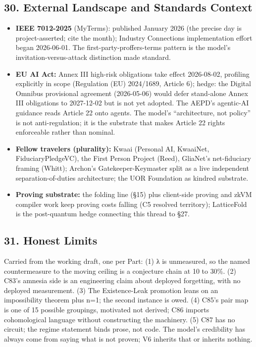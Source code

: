 \documentclass[
  11pt,
]{article}
\providecommand{\tightlist}{%
  \setlength{\itemsep}{0pt}\setlength{\parskip}{0pt}}
\begin{document}
\subsection{30. External Landscape and Standards
Context}\label{external-landscape-and-standards-context}

\begin{itemize}
\tightlist
\item
  \textbf{IEEE 7012-2025} (MyTerms): published January 2026 (the precise
  day is project-asserted; cite the month); Industry Connections
  implementation effort began 2026-06-01. The first-party-proffers-terms
  pattern is the model's invitation-versus-attack distinction made
  standard.
\item
  \textbf{EU AI Act:} Annex III high-risk obligations take effect
  2026-08-02, profiling explicitly in scope (Regulation (EU) 2024/1689,
  Article 6); hedge: the Digital Omnibus provisional agreement
  (2026-05-06) would defer stand-alone Annex III obligations to
  2027-12-02 but is not yet adopted. The AEPD's agentic-AI guidance
  reads Article 22 onto agents. The model's ``architecture, not policy''
  is not anti-regulation; it is the substrate that makes Article 22
  rights enforceable rather than nominal.
\item
  \textbf{Fellow travelers (plurality):} Kwaai (Personal AI, KwaaiNet,
  FiduciaryPledgeVC), the First Person Project (Reed), GliaNet's
  net-fiduciary framing (Whitt); Archon's Gatekeeper-Keymaster split as
  a live independent separation-of-duties architecture; the UOR
  Foundation as kindred substrate.
\item
  \textbf{Proving substrate:} the folding line (§15) plus client-side
  proving and zkVM compiler work keep proving costs falling (C5 resolved
  territory); LatticeFold is the post-quantum hedge connecting this
  thread to §27.
\end{itemize}

\subsection{31. Honest Limits}\label{honest-limits}

Carried from the working draft, one per Part: (1) λ is unmeasured, so
the named countermeasure to the moving ceiling is a conjecture chain at
10 to 30\%. (2) C83's amnesia side is an engineering claim about
deployed forgetting, with no deployed measurement. (3) The
Existence-Leak promotion leans on an impossibility theorem plus n=1; the
second instance is owed. (4) C85's pair map is one of 15 possible
groupings, motivated not derived; C86 imports cohomological language
without constructing the machinery. (5) C87 has no circuit; the regime
statement binds prose, not code. The model's credibility has always come
from saying what is not proven; V6 inherits that or inherits nothing.
\end{document}
